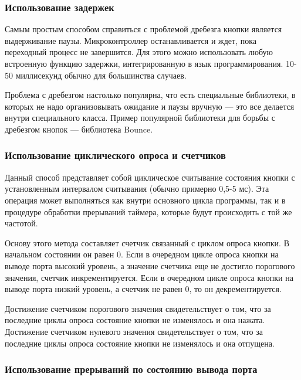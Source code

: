 \documentclass{altsu-report}
\begin{document}
\subsubsection*{Использование задержек}

Самым простым способом справиться с проблемой дребезга кнопки является выдерживание паузы. Микроконтроллер останавливается и ждет, пока переходный процесс не завершится. Для этого можно использовать любую встроенную функцию задержки, интегрированную в язык программирования. 10-50 миллисекунд обычно для большинства случаев.

Проблема с дребезгом настолько популярна, что есть специальные библиотеки, в которых не надо организовывать ожидание и паузы вручную --- это все делается внутри специального класса. Пример популярной библиотеки для борьбы с дребезгом кнопок --- библиотека Bounce.

\subsubsection*{Использование циклического опроса и счетчиков}

Данный способ представляет собой циклическое считывание состояния кнопки с установленным интервалом считывания (обычно примерно 0,5-5 мс). Эта операция может выполняться как внутри основного цикла программы, так и в процедуре обработки прерываний таймера, которые будут происходить с той же частотой.

Основу этого метода составляет счетчик связанный с циклом опроса кнопки. В начальном состоянии он равен 0. Если в очередном цикле опроса кнопки на выводе порта высокий уровень, а значение счетчика еще не достигло порогового значения, счетчик инкрементируется. Если в очередном цикле опроса кнопки на выводе порта низкий уровень, а счетчик не равен 0, то он декрементируется.

Достижение счетчиком порогового значения свидетельствует о том, что за последние циклы опроса состояние кнопки не изменялось и она нажата. Достижение счетчиком нулевого значения свидетельствует о том, что за последние циклы опроса состояние кнопки не изменялось и она отпущена.

\subsubsection*{Использование прерываний по состоянию вывода порта}
\end{document}
